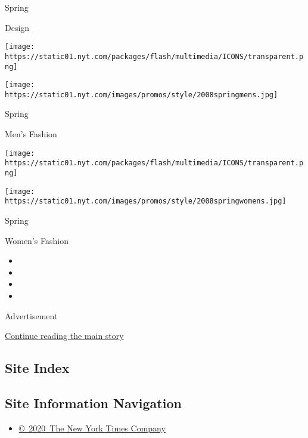 Spring

Design

\texttt{[image: https://static01.nyt.com/packages/flash/multimedia/ICONS/transparent.png]}

\texttt{[image: https://static01.nyt.com/images/promos/style/2008springmens.jpg]}

Spring

Men's Fashion

\texttt{[image: https://static01.nyt.com/packages/flash/multimedia/ICONS/transparent.png]}

\texttt{[image: https://static01.nyt.com/images/promos/style/2008springwomens.jpg]}

Spring

Women's Fashion

\begin{itemize}
\item
\item
\item
\item
\end{itemize}

Advertisement

\protect\hyperlink{after-bottom}{Continue reading the main story}

\hypertarget{site-index}{%
\subsection{Site Index}\label{site-index}}

\hypertarget{site-information-navigation}{%
\subsection{Site Information
Navigation}\label{site-information-navigation}}

\begin{itemize}
\tightlist
\item
  \href{https://help.nytimes.com/hc/en-us/articles/115014792127-Copyright-notice}{©~2020~The
  New York Times Company}
\end{itemize}

